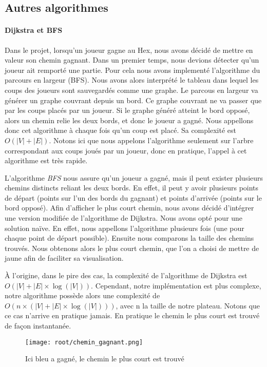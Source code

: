 \documentclass[french,a4paper,10pt]{article}
\begin{document}
\subsection{Autres algorithmes}
\paragraph{Dijkstra et BFS}
Dans le projet, lorsqu'un joueur gagne au Hex, nous avons décidé de mettre en valeur son chemin gagnant.
Dans un premier temps, nous devions détecter qu'un joueur ait remporté une partie. Pour cela nous avons implementé l'algorithme du parcours
en largeur (BFS). Nous avons alors interprété le tableau dans lequel les coups des joueurs sont sauvegardés comme une graphe. Le parcous en largeur
va générer un graphe couvrant depuis un bord. Ce graphe couvrant ne va passer que par les coups placés par un joueur. Si le graphe généré atteint le bord opposé,
alors un chemin relie les deux bords, et donc le joueur a gagné. Nous appellons donc cet algorithme à chaque fois qu'un coup est placé. Sa complexité est $O(\lvert V \rvert + \lvert E \rvert)$.
Notons ici que nous appelons l'algorithme seulement sur l'arbre correspondant aux coups joués par un joueur, donc en pratique, l'appel à cet algorithme
est très rapide.

L'algorithme \emph{BFS} nous assure qu'un joueur a gagné, mais il peut exister plusieurs chemins distincts reliant les deux bords. En effet,
il peut y avoir plusieurs points de départ (points sur l'un des bords du gagnant) et points d'arrivée (points sur le bord opposé).
Afin d'afficher le plus court chemin, nous avons décidé d'intégrer une version modifiée de l'algorithme de Dijkstra.
Nous avons opté pour une solution naïve. En effet, nous appellons l'algorithme plusieurs fois (une pour chaque point de départ possible).
Ensuite nous comparons la taille des chemins trouvés. Nous obtenons alors le plus court chemin, que l'on a choisi de mettre de jaune 
afin de faciliter sa visualisation.

À l'origine, dans le pire des cas, la complexité de l'algorithme de Dijkstra est $O(\lvert V \rvert + \lvert E \rvert \times \log(\lvert V \rvert))$.
Cependant, notre implémentation est plus complexe, notre algorithme possède alors une complexité de $O(n \times (\lvert V \rvert+ \lvert E \rvert\times \log(\lvert V \rvert)))$, avec n la taille de notre plateau.
Notons que ce cas n'arrive en pratique jamais. En pratique le chemin le plus court est trouvé de façon instantanée.

\begin{figure}[h]
    \begin{center}
        \texttt{[image: root/chemin\_gagnant.png]}
    \end{center}
    \caption{Ici bleu a gagné, le chemin le plus court est trouvé}\label{fig:chemin_gagnant}
\end{figure}
\end{document}
